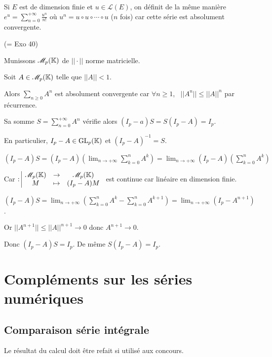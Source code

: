 \begin{remarque}
    Si $E$ est de dimension finie et $u \in \mathscr{L }(E)$, on définit de la même manière 
    $\displaystyle e^u = \sum_{n = 0}^{+\infty} \frac{u^n}{n!}$ où $u^n = u \circ u \circ \cdots \circ u$ ($n$ fois)
    car cette série est absolument convergente. 
\end{remarque}

\begin{exemple} (= Exo 40)

    Munissons $\mathscr M_p (\mathbb{K})$ de $|| \cdot ||$ norme matricielle. 

    Soit $A \in \mathscr M_p(\mathbb{K})$ telle que $|| A || < 1$. 

    Alors $\sum_{n \geqslant 0 } A^n$ est absolument convergente car 
    $\forall n \geqslant 1$, \, $|| A^n || \leqslant || A ||^n$ par récurrence. 

    Sa somme $\displaystyle S = \sum_{n = 0}^{+ \infty } A^n$ vérifie alors $(I_p - a ) S = S(I_p - A) = I_p$.

    En particulier, $I_p - A \in \operatorname{GL}_p (\mathbb{K})$ et $(I_p - A)^{-1} = S$. 

    $\displaystyle (I_p - A)S = (I_p - A) \left(\lim_{n \to + \infty} \sum_{k = 0 }^{n } A^k \right) = \lim_{n \to + \infty} (I_p - A) \left( \sum_{k = 0}^{n } A^k \right) $

    Car $: \space \begin{array}{|ccc} \displaystyle \mathscr M_p(\mathbb{K}) & \to & \displaystyle \mathscr M_p(\mathbb{K}) \\ \displaystyle M & \mapsto & \displaystyle (I_p - A)M \end{array}$ est continue car linéaire
    en dimension finie. 

    $\displaystyle (I_p - A)S = \lim_{n \to + \infty} \left( \sum_{k = 0}^{n } A^k - \sum_{k = 0}^{n } A^{k + 1} \right) = \lim_{n \to + \infty} (I_p - A^{n + 1})$.

    Or $|| A^{n + 1} || \leqslant || A ||^{n + 1} \longrightarrow 0$ donc $A^{n + 1} \longrightarrow 0$.

    Donc $(I_p - A)S = I_p$. De même $S(I_p - A) = I_p$.

\end{exemple}

\section{Compléments sur les séries numériques}
\subsection{Comparaison série intégrale }

Le résultat du calcul doit être refait si utilisé aux concours. 

